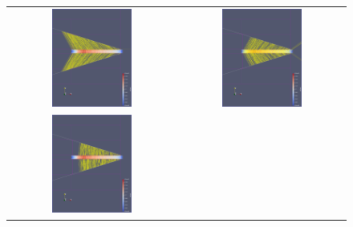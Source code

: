 \documentclass[a4paper,10pt]{article}
\begin{document}
    \begin{figure}
        \centering
        \begin{tabular}{c c}
            \includegraphics[width=0.5\textwidth]{images/open_rand/1.png} &
            \includegraphics[width=0.5\textwidth]{images/open_rand/2.png} \\
            \includegraphics[width=0.5\textwidth]{images/open_rand/3.png} &

\end{tabular}
\end{figure}
\end{document}

